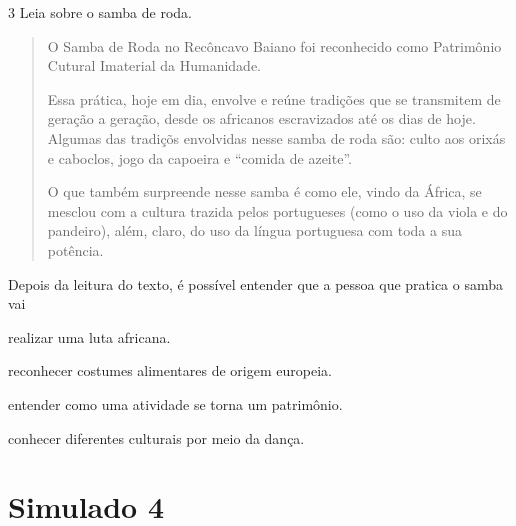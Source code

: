 \num{3} Leia sobre o samba de roda.
\begin{quote}
O Samba de Roda no Recôncavo Baiano foi reconhecido como Patrimônio Cutural Imaterial da Humanidade.

Essa prática, hoje em dia, envolve e reúne tradições que se transmitem de geração a geração, desde os africanos escravizados até os dias de hoje. Algumas das tradiçõs envolvidas nesse samba de roda são: culto aos orixás e caboclos, jogo da capoeira e “comida de azeite”.

O que também surpreende nesse samba é como ele, vindo da África, se mesclou com a cultura trazida pelos portugueses (como o uso da viola e do pandeiro), além, claro, do uso da língua portuguesa com toda a sua potência.


\end{quote}

\noindent{}Depois da leitura do texto, é possível entender que a pessoa que pratica o samba vai

\begin{escolha}
\item realizar uma luta africana.

\item reconhecer costumes alimentares de origem europeia.

\item entender como uma atividade se torna um patrimônio.

\item conhecer diferentes culturais por meio da dança.
\end{escolha}



\chapter{Simulado 4}

